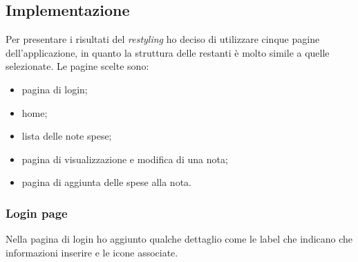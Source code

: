 \subsection{Implementazione}

Per presentare i risultati del \emph{restyling} ho deciso di utilizzare cinque pagine dell'applicazione, in quanto la struttura delle restanti è molto simile a quelle selezionate. Le pagine scelte sono:
\begin{itemize}
    \item pagina di login;
    \item home;
    \item lista delle note spese;
    \item pagina di visualizzazione e modifica di una nota;
    \item pagina di aggiunta delle spese alla nota.
\end{itemize}

\subsubsection{Login page}

Nella pagina di login ho aggiunto qualche dettaglio come le label che indicano che informazioni inserire e le icone associate.

